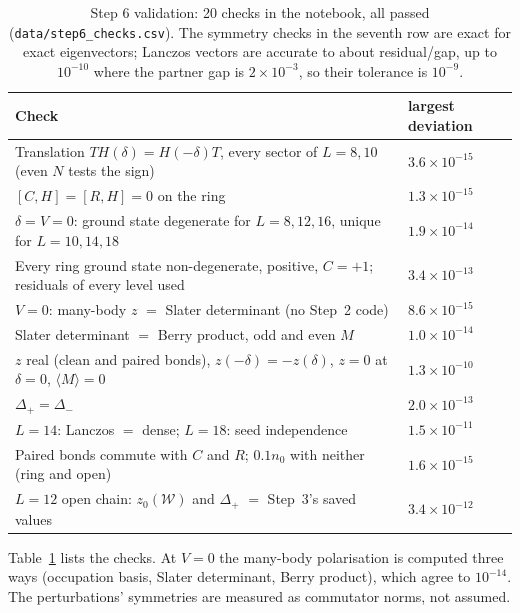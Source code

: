 \documentclass[11pt,a4paper]{article}
\begin{document}
\begin{table}[t]
  \centering
  \footnotesize
  \begin{tabular}{p{11.2cm}l}
    \toprule
    Check & largest deviation \\
    \midrule
    Translation $TH(\delta)=H(-\delta)T$, every sector of $L=8,10$ (even $N$ tests the sign) & $3.6\times10^{-15}$ \\
    $[C,H]=[R,H]=0$ on the ring & $1.3\times10^{-15}$ \\
    $\delta=V=0$: ground state degenerate for $L=8,12,16$, unique for $L=10,14,18$ & $1.9\times10^{-14}$ \\
    Every ring ground state non-degenerate, positive, $C=+1$; residuals of every level used & $3.4\times10^{-13}$ \\
    $V=0$: many-body $z$ $=$ Slater determinant (no Step~2 code) & $8.6\times10^{-15}$ \\
    Slater determinant $=$ Berry product, odd and even $M$ & $1.0\times10^{-14}$ \\
    $z$ real (clean and paired bonds), $z(-\delta)=-z(\delta)$, $z=0$ at $\delta=0$, $\langle M\rangle=0$ & $1.3\times10^{-10}$ \\
    $\Delta_+=\Delta_-$ & $2.0\times10^{-13}$ \\
    $L=14$: Lanczos $=$ dense; $L=18$: seed independence & $1.5\times10^{-11}$ \\
    Paired bonds commute with $C$ and $R$; $0.1n_0$ with neither (ring and open) & $1.6\times10^{-15}$ \\
    $L=12$ open chain: $z_0(\mathcal W)$ and $\Delta_+$ $=$ Step~3's saved values & $3.4\times10^{-12}$ \\
    \bottomrule
  \end{tabular}
  \caption{Step 6 validation: 20 checks in the notebook, all passed (\texttt{data/step6\_checks.csv}). The symmetry checks in the seventh row are exact for exact eigenvectors; Lanczos vectors are accurate to about residual/gap, up to $10^{-10}$ where the partner gap is $2\times10^{-3}$, so their tolerance is $10^{-9}$.}
  \label{tab:checks6}
\end{table}

Table~\ref{tab:checks6} lists the checks.
At $V=0$ the many-body polarisation is computed three ways (occupation basis, Slater determinant, Berry product), which agree to $10^{-14}$.
The perturbations' symmetries are measured as commutator norms, not assumed.

\end{document}
